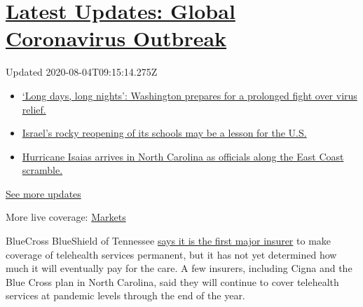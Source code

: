 \hypertarget{latest-updates-global-coronavirus-outbreak}{%
\section{\texorpdfstring{\href{https://www.nytimes3xbfgragh.onion/2020/08/04/world/coronavirus-covid-19.html?action=click\&pgtype=Article\&state=default\&region=MAIN_CONTENT_1\&context=storylines_live_updates}{Latest
Updates: Global Coronavirus
Outbreak}}{Latest Updates: Global Coronavirus Outbreak}}\label{latest-updates-global-coronavirus-outbreak}}

Updated 2020-08-04T09:15:14.275Z

\begin{itemize}
\tightlist
\item
  \href{https://www.nytimes3xbfgragh.onion/2020/08/04/world/coronavirus-covid-19.html?action=click\&pgtype=Article\&state=default\&region=MAIN_CONTENT_1\&context=storylines_live_updates\#link-6b644638}{`Long
  days, long nights': Washington prepares for a prolonged fight over
  virus relief.}
\item
  \href{https://www.nytimes3xbfgragh.onion/2020/08/04/world/coronavirus-covid-19.html?action=click\&pgtype=Article\&state=default\&region=MAIN_CONTENT_1\&context=storylines_live_updates\#link-7af9fca0}{Israel's
  rocky reopening of its schools may be a lesson for the U.S.}
\item
  \href{https://www.nytimes3xbfgragh.onion/2020/08/04/world/coronavirus-covid-19.html?action=click\&pgtype=Article\&state=default\&region=MAIN_CONTENT_1\&context=storylines_live_updates\#link-33bf9168}{Hurricane
  Isaias arrives in North Carolina as officials along the East Coast
  scramble.}
\end{itemize}

\href{https://www.nytimes3xbfgragh.onion/2020/08/04/world/coronavirus-covid-19.html?action=click\&pgtype=Article\&state=default\&region=MAIN_CONTENT_1\&context=storylines_live_updates}{See
more updates}

More live coverage:
\href{https://www.nytimes3xbfgragh.onion/live/2020/08/03/business/stock-market-today-coronavirus?action=click\&pgtype=Article\&state=default\&region=MAIN_CONTENT_1\&context=storylines_live_updates}{Markets}

BlueCross BlueShield of Tennessee
\href{https://bcbstnews.com/pressreleases/bluecross-making-in-network-telehealth-services-permanent/}{says
it is the first major insurer} to make coverage of telehealth services
permanent, but it has not yet determined how much it will eventually pay
for the care. A few insurers, including Cigna and the Blue Cross plan in
North Carolina, said they will continue to cover telehealth services at
pandemic levels through the end of the year.

